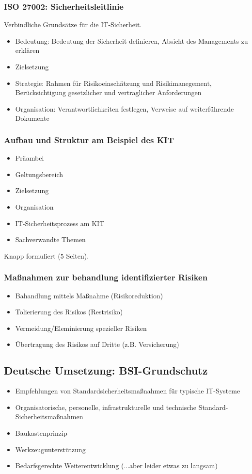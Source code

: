 \subsubsection{ISO 27002: Sicherheitsleitlinie}
Verbindliche Grundsätze für die IT-Sicherheit.
\begin{itemize}
	\item Bedeutung: Bedeutung der Sicherheit definieren, Absicht des Managements zu erklären
	\item Zielsetzung
	\item Strategie: Rahmen für Risikoeinschätzung und Risikimanegement, Berücksichtigung gesetzlicher und vertraglicher Anforderungen
	\item Organisation: Verantwortlichkeiten festlegen, Verweise auf weiterführende Dokumente
\end{itemize}

\subsubsection{Aufbau und Struktur am Beispiel des KIT}
\begin{itemize}
	\item Präambel
	\item Geltungsbereich
	\item Zielsetzung
	\item Organisation
	\item IT-Sicherheitsprozess am KIT
	\item Sachverwandte Themen
\end{itemize}
Knapp formuliert (5 Seiten).

\subsubsection{Maßnahmen zur behandlung identifizierter Risiken}
\begin{itemize}
	\item Bahandlung mittels Maßnahme (Risikoreduktion)
	\item Tolierierung des Risikos (Restrisiko)
	\item Vermeidung/Eleminierung spezieller Risiken
	\item Übertragung des Risikos auf Dritte (z.B. Versicherung)
\end{itemize}


\subsection{Deutsche Umsetzung: BSI-Grundschutz}
\begin{itemize}
	\item Empfehlungen von Standardsicherheitsmaßnahmen für typische IT-Systeme
	\item Organisatorische, personelle, infrastrukturelle und technische Standard-Sicherheitsmaßnahmen
	\item Baukastenprinzip
	\item Werkzeugunterstützung
	\item Bedarfsgerechte Weiterentwicklung (...aber leider etwas zu langsam)
\end{itemize}

